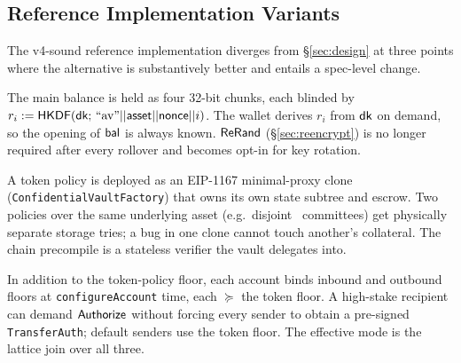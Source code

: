 \subsection{Reference Implementation Variants }
\label{sec:improvements}

The v4-sound reference implementation diverges from
\S\ref{sec:design} at three points where the alternative is
substantively better and entails a spec-level change.

\one
{}
The main balance is held as four 32-bit chunks, each blinded by
$r_i := \mathsf{HKDF}(\textsf{dk};\, \text{``av''} \vert\vert \mathsf{asset} \vert\vert \mathsf{nonce} \vert\vert i)$.
The wallet derives $r_i$ from $\textsf{dk}$ on demand, so the opening of
$\mathsf{bal}$ is always known.
$\mathsf{ReRand}$ (\S\ref{sec:reencrypt}) is no longer required after every
rollover and becomes opt-in for key rotation.

\one
{}
A token policy is deployed as an EIP-1167 minimal-proxy clone
(\texttt{ConfidentialVaultFactory}) that owns its own state subtree
and escrow.
Two policies over the same underlying asset (e.g.\ disjoint \CE\
committees) get physically separate storage tries; a bug in one
clone cannot touch another's collateral.
The chain precompile is a stateless verifier the vault delegates
into.

\one
{}
In addition to the token-policy floor, each account binds inbound
and outbound floors at \texttt{configureAccount} time, each
$\succeq$ the token floor.
A high-stake recipient can demand $\mathsf{Authorize}$ without forcing every
sender to obtain a pre-signed \texttt{TransferAuth}; default
senders use the token floor.
The effective mode is the lattice join over all three.
